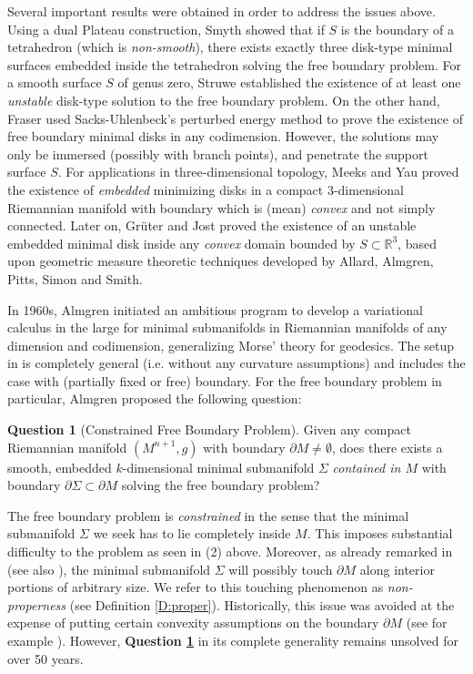\documentclass[10pt]{amsart}
\theoremstyle{definition}
\newtheorem{question}{Question}
\theoremstyle{remark}
\numberwithin{equation}{section}
\newcommand{\R}{\mathbb{R}}
\begin{document}
Several important results were obtained in order to address the issues above. Using a dual Plateau construction, Smyth \cite{Smyth84} showed that if $S$ is the boundary of a tetrahedron (which is \emph{non-smooth}), there exists exactly three disk-type minimal surfaces embedded inside the tetrahedron solving the free boundary problem. For a smooth surface $S$ of genus zero, Struwe \cite{Struwe84} \cite{Struwe88} established %
the existence of at least one \emph{unstable} disk-type solution to the free boundary problem. On the other hand, Fraser \cite{Fraser00} used Sacks-Uhlenbeck's perturbed energy method to prove the existence of free boundary minimal disks in any codimension. However, the solutions may only be immersed (possibly with branch points), and penetrate the support surface $S$. For applications in three-dimensional topology, Meeks and Yau \cite{Meeks-Yau80} proved the existence of \emph{embedded} minimizing disks in a compact $3$-dimensional Riemannian manifold with boundary which is (mean) \emph{convex} and not simply connected. Later on, Gr\"{u}ter and Jost \cite{Gruter-Jost86a} proved the existence of an unstable embedded minimal disk inside any \emph{convex} domain bounded by $S \subset \R^3$, based upon geometric measure theoretic techniques developed by Allard, Almgren, Pitts, Simon and Smith.

In 1960s, %
Almgren \cite{Almgren65} initiated an ambitious program to develop a variational calculus in the large for minimal submanifolds in Riemannian manifolds of any dimension and codimension, generalizing Morse' theory for geodesics. The setup in \cite{Almgren65} is completely general (i.e. without any curvature assumptions) and includes the case %
with (partially fixed or free) boundary. For the free boundary problem in particular, Almgren proposed the following question:

\begin{question}[Constrained Free Boundary Problem]
\label{Q2}
Given any compact Riemannian manifold $(M^{n+1},g)$ with boundary $\partial M \neq \emptyset$, does there exists a smooth, embedded $k$-dimensional minimal submanifold $\Sigma$ \emph{contained in $M$} with boundary $\partial \Sigma \subset \partial M$ solving the free boundary problem?
\end{question}

The free boundary problem is \emph{constrained} in the sense that the minimal submanifold $\Sigma$ we seek has to lie completely inside $M$. This imposes substantial difficulty to the problem as seen in (2) above. Moreover, as already remarked in \cite{Tomi86} (see also \cite{Li15}), the minimal submanifold $\Sigma$ will possibly touch $\partial M$ along interior portions of arbitrary size. We refer to this touching phenomenon as \emph{non-properness} (see Definition \ref{D:proper}). Historically, this issue was avoided at the expense of putting certain convexity assumptions on the boundary $\partial M$ (see for example \cite{Meeks-Yau80} \cite{Gruter-Jost86a} \cite{Fraser02}). However, \textbf{Question \ref{Q2}} in its complete generality remains unsolved for over 50 years.
\end{document}
